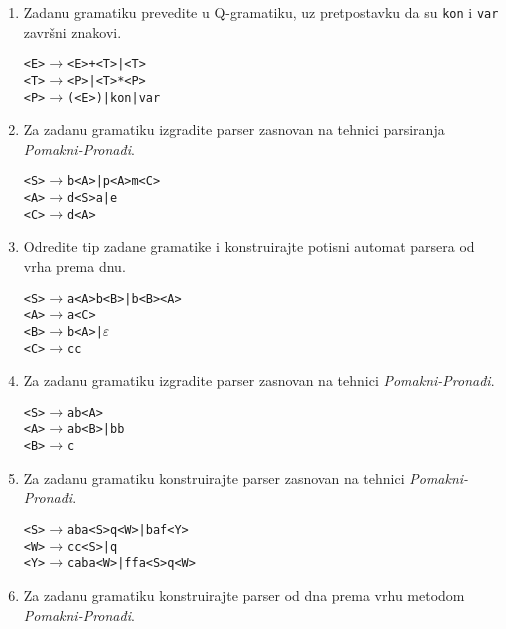 \documentclass[times, 12pt, utf8]{book}
\begin{document}
\begin{enumerate}[resume]
\item 
Zadanu gramatiku prevedite u Q-gramatiku, uz pretpostavku da su \texttt{kon} i \texttt{var} završni znakovi. \cite[str.~91-98]{udzbenik}

\begin{alltt}
<E> \(\to\) <E>+<T> | <T>
<T> \(\to\) <P> | <T>*<P>
<P> \(\to\) (<E>) | kon | var
\end{alltt} 

\item
Za zadanu gramatiku izgradite parser zasnovan na tehnici parsiranja \emph{Pomakni-Pronađi}. \cite[str.~121-123]{udzbenik}

\begin{alltt}
<S> \(\to\) b<A> | p<A>m<C>
<A> \(\to\) d<S>a | e
<C> \(\to\) d<A>
\end{alltt} 

\item
Odredite tip zadane gramatike i konstruirajte potisni automat parsera od vrha prema dnu.  \cite[str.~84-100]{udzbenik}

\begin{alltt}
<S> \(\to\) a<A>b<B> | b<B><A>
<A> \(\to\) a<C>
<B> \(\to\) b<A> | \(\varepsilon\)
<C> \(\to\) cc
\end{alltt}

\item
Za zadanu gramatiku izgradite parser zasnovan na tehnici \emph{Pomakni-Pronađi}. \cite[str.~121-123]{udzbenik} \cite{auditorne}

\begin{alltt}
<S> \(\to\) ab<A>
<A> \(\to\) ab<B> | bb
<B> \(\to\) c
\end{alltt} 

\item
Za zadanu gramatiku konstruirajte parser zasnovan na tehnici \emph{Pomakni-Pronađi}. \cite[str.~121-123]{udzbenik} \cite{auditorne}

\begin{alltt}
<S> \(\to\) aba<S>q<W> | baf<Y>
<W> \(\to\) cc<S> | q
<Y> \(\to\) caba<W> | ffa<S>q<W>
\end{alltt} 

\item 
Za zadanu gramatiku konstruirajte parser od dna prema vrhu metodom \emph{Pomakni-Pronađi}. \cite[str.~121-123]{udzbenik} \cite{auditorne}


\end{enumerate}
\end{document}

